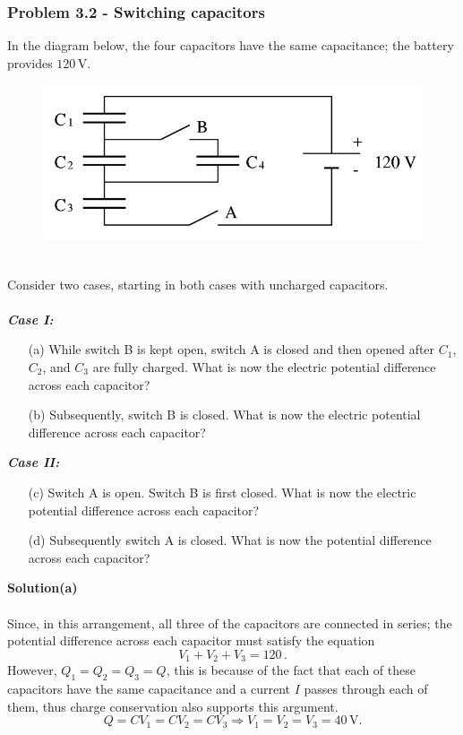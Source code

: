 \documentclass{article}
\begin{document}
\subsubsection*{Problem 3.2 - Switching capacitors}
In the diagram below, the four capacitors have the same capacitance; the battery provides $120\,$V.
\begin{figure}[h]
    \centering
    \includegraphics[width=0.5\linewidth]{figs/fig_prob_3.2.png}
\end{figure}
\\Consider two cases, starting in both cases with uncharged capacitors.
\\
\\\textbf{\textit{Case I:}}
\begin{enumerate}
    \item[(a)]While switch B is kept open, switch A is closed and then opened after $C_1$, $C_2$, and $C_3$ are fully charged. What is now the electric potential difference across each capacitor?
    \item[(b)]Subsequently, switch B is closed. What is now the electric potential difference across each capacitor?
\end{enumerate}
\textbf{\textit{Case II:}}
\begin{enumerate}
    \item[(c)]Switch A is open. Switch B is first closed. What is now the electric potential difference across each capacitor?
    \item[(d)]Subsequently switch A is closed. What is now the potential difference across each capacitor?
\end{enumerate}
\textbf{Solution(a)}
\\
\\
Since, in this arrangement, all three of the capacitors are connected in series; the potential difference across each capacitor must satisfy the equation
\[V_1+V_2+V_3=120\,.\]
However, $Q_1=Q_2=Q_3=Q$, this is because of the fact that each of these capacitors have the same capacitance and a current $I$ passes through each of them, thus charge conservation also supports this argument.
\[Q=CV_1=CV_2=CV_3\Rightarrow V_1=V_2=V_3=40\,\text{V}.\]
\end{document}
